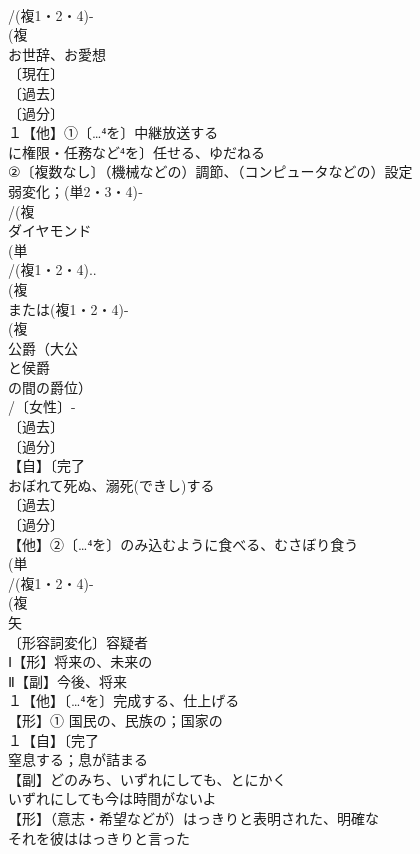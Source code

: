 \documentclass[8pt]{extreport}
\begin{document}
\begin{CJK}{UTF8}{min}
\\	/(複1・2・4)-
\\	(複
\\	お世辞、お愛想 
\\	〔現在〕
\\	〔過去〕
\\	〔過分〕
\\	１【他】①〔…⁴を〕中継放送する 
\\	に権限・任務など⁴を〕任せる、ゆだねる 
\\	②〔複数なし〕（機械などの）調節、（コンピュータなどの）設定
\\	弱変化；(単2・3・4)‐
\\	/(複
\\	ダイヤモンド 
\\	(単
\\	/(複1・2・4)..
\\	(複
\\	または(複1・2・4)-
\\	(複
\\	公爵（大公
\\	と侯爵
\\	の間の爵位）
\\	/〔女性〕-
\\	〔過去〕
\\	〔過分〕
\\	【自】〔完了
\\	おぼれて死ぬ、溺死(できし)する 
\\	〔過去〕
\\	〔過分〕
\\	【他】②〔…⁴を〕のみ込むように食べる、むさぼり食う
\\	(単
\\	/(複1・2・4)-
\\	(複
\\	矢 
\\	〔形容詞変化〕容疑者 
\\	Ⅰ【形】将来の、未来の 
\\	Ⅱ【副】今後、将来
\\	１【他】〔…⁴を〕完成する、仕上げる 
\\	【形】① 国民の、民族の；国家の
\\	１【自】〔完了
\\	窒息する；息が詰まる
\\	【副】どのみち、いずれにしても、とにかく 
\\	いずれにしても今は時間がないよ
\\	【形】（意志・希望などが）はっきりと表明された、明確な 
\\	それを彼ははっきりと言った

\end{CJK}
\end{document}
